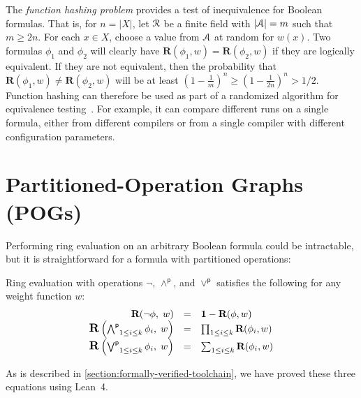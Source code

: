 \documentclass[letterpaper,USenglish,cleveref, autoref, thm-restate]{lipics-v2021}
\newcommand{\pand}{\mathbin{\land^\textsf{p}}}
\newcommand{\por}{\mathbin{\lor^\textsf{p}}}
\DeclareMathOperator*{\Pand}{\bigwedge^\textsf{p}}
\DeclareMathOperator*{\Por}{\bigvee^\textsf{p}}
\newcommand{\boolnot}{\neg}
\newcommand{\varset}{X}
\newcommand{\ring}{{\cal R}}
\newcommand{\dset}{{\cal A}}
\newcommand{\rep}{\textbf{R}}
\newcommand{\mulident}{\textbf{1}}
\newcommand{\lean}{Lean~4}
\begin{document}
The \emph{function hashing problem} provides a test
of inequivalence for Boolean formulas.  That is, for $n = |\varset|$, let $\ring$ be a
finite  field with $|\dset| = m$ such that $m \geq 2 n$.  For each $x \in \varset$, choose a value from $\dset$ at random for $w(x)$.  Two formulas
$\phi_1$ and $\phi_2$ will clearly have $\rep(\phi_1, w) = \rep(\phi_2, w)$
if they are logically equivalent.
If they are not equivalent, then
the probability that $\rep(\phi_1, w) \not = \rep(\phi_2, w)$ will be at
least $\left(1-\frac{1}{m}\right)^n \geq \left(1-\frac{1}{2n}\right)^n > 1/2$.
Function hashing can therefore be used as part of a
randomized algorithm for equivalence testing~\cite{blum:ipl:1980}.
For example, it can compare different runs on a single formula,
either from different compilers or from a single compiler with different configuration parameters.


\section{Partitioned-Operation Graphs (POGs)}
\label{sect:pog}

Performing ring evaluation on an arbitrary Boolean formula could be intractable, but it is straightforward for a formula with partitioned operations:
\begin{proposition}
\label{prop:ring:eval}
Ring evaluation with operations $\boolnot$, $\pand$, and $\por$ satisfies the following for any weight function $w$:
\begin{displaymath}
\begin{array}{rcl}
\rep(\boolnot \phi,\; w) &=& \mulident - \rep(\phi, w) \\ %
\textstyle
\scalebox{1.2}{\rep}\left(\Pand_{1 \leq i \leq k} \phi_i,\; w \right) &=& \prod_{1 \leq i \leq k} \rep(\phi_i, w) \\ %
\textstyle
\scalebox{1.2}{\rep}\left(\Por_{1 \leq i \leq k} \phi_i,\; w\right) &=& \sum_{1 \leq i \leq k} \rep(\phi_i, w) \\ %
\end{array}
\end{displaymath}
\end{proposition}
As is described in \cref{section:formally-verified-toolchain}, we have proved these three equations using \lean{}.
\end{document}
